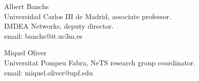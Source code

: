 \documentclass[line,margin]{res}
\begin{document}

Albert Banchs\\
Universidad Carlos III de Madrid, associate professor.\\
IMDEA Networks, deputy director.\\
email: banchs@it.uc3m.es

Miquel Oliver \\
Universitat Pompeu Fabra, NeTS research group coordinator.\\
email: miquel.oliver@upf.edu









\end{document}
